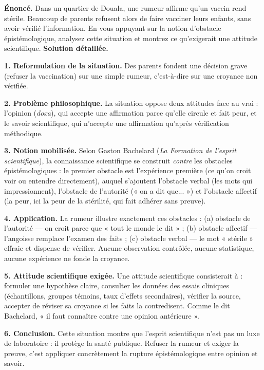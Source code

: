 \documentclass[11pt]{article}
\newcommand{\cle}[1]{{\popxbold\color{popdark}#1}}
\begin{document}
\begin{exoresolu}
\textbf{Énoncé.} Dans un quartier de Douala, une rumeur affirme qu'un vaccin rend stérile. Beaucoup de parents refusent alors de faire vacciner leurs enfants, sans avoir vérifié l'information. En vous appuyant sur la notion d'obstacle épistémologique, analysez cette situation et montrez ce qu'exigerait une attitude scientifique.
\tcblower
\textbf{Solution détaillée.}

\textbf{1. Reformulation de la situation.} Des parents fondent une décision grave (refuser la vaccination) sur une simple rumeur, c'est-à-dire sur une croyance non vérifiée.

\textbf{2. Problème philosophique.} La situation oppose deux attitudes face au vrai : l'opinion (\emph{doxa}), qui accepte une affirmation parce qu'elle circule et fait peur, et le savoir scientifique, qui n'accepte une affirmation qu'après vérification méthodique.

\textbf{3. Notion mobilisée.} Selon Gaston Bachelard (\emph{La Formation de l'esprit scientifique}), la connaissance scientifique se construit \emph{contre} les obstacles épistémologiques : le premier obstacle est \cle{l'expérience première} (ce qu'on croit voir ou entendre directement), auquel s'ajoutent l'obstacle verbal (les mots qui impressionnent), l'obstacle de l'autorité (« on a dit que... ») et l'obstacle affectif (la peur, ici la peur de la stérilité, qui fait adhérer sans preuve).

\textbf{4. Application.} La rumeur illustre exactement ces obstacles : (a) obstacle de l'autorité — on croit parce que « tout le monde le dit » ; (b) obstacle affectif — l'angoisse remplace l'examen des faits ; (c) obstacle verbal — le mot « stérile » effraie et dispense de vérifier. Aucune observation contrôlée, aucune statistique, aucune expérience ne fonde la croyance.

\textbf{5. Attitude scientifique exigée.} Une attitude scientifique consisterait à : formuler une hypothèse claire, consulter les données des essais cliniques (échantillons, groupes témoins, taux d'effets secondaires), vérifier la source, accepter de réviser sa croyance si les faits la contredisent. Comme le dit Bachelard, « il faut connaître contre une opinion antérieure ».

\textbf{6. Conclusion.} Cette situation montre que l'esprit scientifique n'est pas un luxe de laboratoire : il protège la santé publique. Refuser la rumeur et exiger la preuve, c'est appliquer concrètement la rupture épistémologique entre opinion et savoir.
\end{exoresolu}
\end{document}
